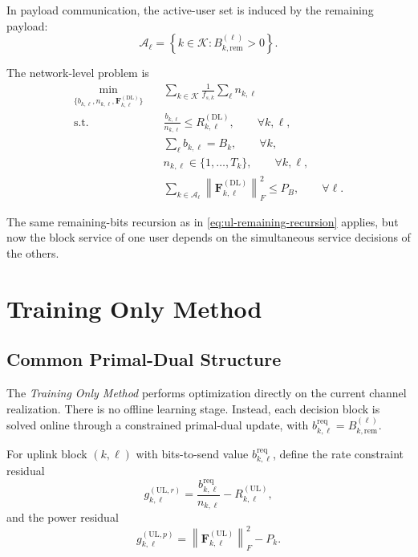 \documentclass[11pt]{article}
\newcommand{\Kset}{\mathcal{K}}
\newcommand{\Aset}{\mathcal{A}}
\newcommand{\F}{\mathbf{F}}
\newcommand{\norm}[1]{\left\lVert #1 \right\rVert}
\newcommand{\UL}{\mathrm{UL}}
\newcommand{\DL}{\mathrm{DL}}
\begin{document}
In payload communication, the active-user set is induced by the remaining
payload:
\begin{equation}
\Aset_\ell
=
\left\{
k\in\Kset : B_{k,\mathrm{rem}}^{(\ell)}>0
\right\}.
\label{eq:dl-active-payload}
\end{equation}

The network-level problem is
\begin{subequations}
\begin{align}
\min_{\{b_{k,\ell},n_{k,\ell},\F_{k,\ell}^{(\DL)}\}}
\quad
&
\sum_{k\in\Kset}\frac{1}{f_{s,k}}\sum_{\ell} n_{k,\ell}
\label{eq:dl-payload-obj}
\\
\text{s.t.}\quad
&
\frac{b_{k,\ell}}{n_{k,\ell}}
\le
R_{k,\ell}^{(\DL)},
\qquad \forall k,\ell,
\label{eq:dl-payload-fbl}
\\
&
\sum_{\ell} b_{k,\ell} = B_k,
\qquad \forall k,
\label{eq:dl-payload-conservation}
\\
&
n_{k,\ell} \in \{1,\dots,T_k\},
\qquad \forall k,\ell,
\label{eq:dl-payload-n}
\\
&
\sum_{k\in\Aset_\ell}\norm{\F_{k,\ell}^{(\DL)}}_F^2 \le P_B,
\qquad \forall \ell.
\label{eq:dl-payload-power}
\end{align}
\end{subequations}

The same remaining-bits recursion as in
\eqref{eq:ul-remaining-recursion} applies, but now the block service of one
user depends on the simultaneous service decisions of the others.

\section{Training Only Method}

\subsection{Common Primal-Dual Structure}

The \emph{Training Only Method} performs optimization directly on the current
channel realization. There is no offline learning stage. Instead, each decision
block is solved online through a constrained primal-dual update, with
$b_{k,\ell}^{\mathrm{req}} = B_{k,\mathrm{rem}}^{(\ell)}$.

For uplink block $(k,\ell)$ with bits-to-send value
$b_{k,\ell}^{\mathrm{req}}$, define the rate constraint residual
\begin{equation}
g_{k,\ell}^{(\UL,r)}
=
\frac{b_{k,\ell}^{\mathrm{req}}}{n_{k,\ell}} - R_{k,\ell}^{(\UL)},
\label{eq:ul-rate-residual}
\end{equation}
and the power residual
\begin{equation}
g_{k,\ell}^{(\UL,p)}
=
\norm{\F_{k,\ell}^{(\UL)}}_F^2 - P_k.
\label{eq:ul-power-residual}
\end{equation}
\end{document}
